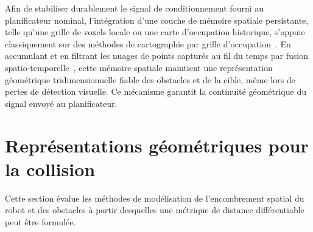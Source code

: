 Afin de stabiliser durablement le signal de conditionnement fourni au planificateur nominal, l'intégration d'une couche de mémoire spatiale persistante, telle qu'une grille de voxels locale ou une carte d'occupation historique, s'appuie classiquement sur des méthodes de cartographie par grille d'occupation~\cite{Elfes1989Using,Hornung2013Octomap}. En accumulant et en filtrant les nuages de points capturés au fil du temps par fusion spatio-temporelle~\cite{Curless1996Volumetric,Newcombe2011KinectFusion}, cette mémoire spatiale maintient une représentation géométrique tridimensionnelle fiable des obstacles et de la cible, même lors de pertes de détection visuelle. Ce mécanisme garantit la continuité géométrique du signal envoyé au planificateur.

\section{Représentations géométriques pour la collision}

Cette section évalue les méthodes de modélisation de l'encombrement spatial du robot et des obstacles à partir desquelles une métrique de distance différentiable peut être formulée.

